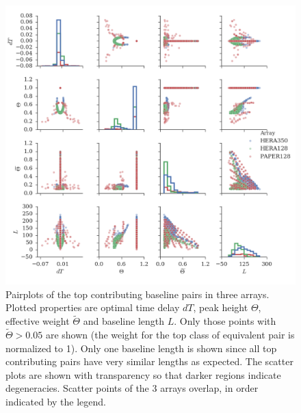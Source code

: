\documentclass[twocolumn,apj,numberedappendix]{emulateapj}
\renewcommand\[{\begin{equation}}
\renewcommand\]{\end{equation}}
\begin{document}
\begin{widetext}
\begin{figure}[H]
\includegraphics[width=\textwidth]{pairplot}

\caption{Pairplots of the top contributing baseline pairs in three arrays. Plotted properties are optimal time delay $dT$, peak height $\Theta$, effective weight $\widetilde{\Theta}$ and baseline length $L$. Only those points with $\widetilde{\Theta}>0.05$ are shown (the weight for the top class of equivalent pair is normalized to 1). Only one baseline length is shown since all top contributing pairs have very similar lengths as expected. The scatter plots are shown with transparency so that darker regions indicate degeneracies. Scatter points of the 3 arrays overlap, in order indicated by the legend. }
\label{fig:pairplot}
\end{figure}
\end{widetext}
\end{document}
